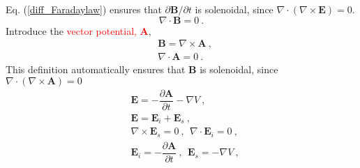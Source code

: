 \documentclass[12pt,a4paper]{article}
\renewcommand{\vec}[1]{\boldsymbol{#1}}
\begin{document}
Eq. (\ref{diff_Faradaylaw}) ensures that $\partial \vec{B}/\partial t$ is solenoidal, since $\nabla \cdot (\nabla \times \vec{E}) = 0$. 
\begin{equation}
\nabla \cdot \vec{B} = 0 ~.
\end{equation}
Introduce the \textcolor{red}{vector potential, $\vec{A}$}, 
\begin{align}
& \vec{B}  = \nabla \times \vec{A} ~, \\
& \nabla \cdot \vec{A} = 0 ~.
\end{align}
This definition automatically ensures that $\vec{B}$ is solenoidal, since $\nabla \cdot (\nabla \times \vec{A}) = 0$
\begin{align}
& \vec{E} = -\dfrac{\partial \vec{A}}{\partial t} -\nabla V ~, \\
& \vec{E} = \vec{E}_i +\vec{E}_s ~, \\
& \nabla \times \vec{E}_s = 0 ~, ~~ \nabla \cdot \vec{E}_i = 0 ~, \\
& \vec{E}_i = -\dfrac{\partial \vec{A}}{\partial t} ~, ~~ \vec{E}_s = -\nabla V ~, 
\end{align}
\end{document}
